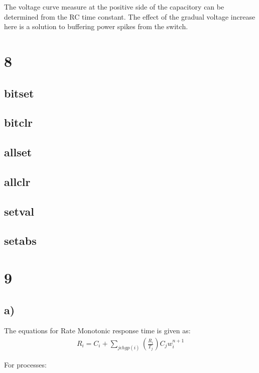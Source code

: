 \documentclass[11pt,letterpaper]{article}
\begin{document}
The voltage curve measure at the positive side of the capacitory can be determined from the RC time
constant. The effect of the gradual voltage increase here is a solution to buffering power spikes from the
switch.


\section*{8}
\subsection*{bitset}


\subsection*{bitclr}


\subsection*{allset}


\subsection*{allclr}


\subsection*{setval}


\subsection*{setabs}



\section*{9}
\subsection*{a)}
The equations for Rate Monotonic response time is given as:
\begin{eqnarray}
	R_i = C_i + \sum_{j \epsilon hgp(i)}^{} (\frac{R_i}{T_j})C_j
	w_{i}^{n + 1}
\end{eqnarray}

For processes:
\end{document}
